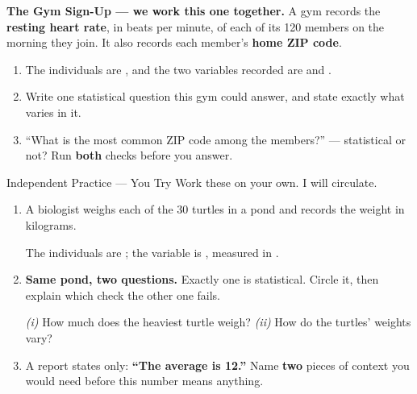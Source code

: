 \documentclass[10pt]{article}
\begin{document}
\boxguard[20]
\begin{practicebox}
\small
\textbf{The Gym Sign-Up --- we work this one together.} A gym records the \textbf{resting heart
rate}, in beats per minute, of each of its 120 members on the morning they join. It also records
each member's \textbf{home ZIP code}.

\begin{enumerate}[label=\textbf{\alph*.}, leftmargin=1.8em, itemsep=7pt]
  \item The individuals are \blank{4.6cm}, and the two variables recorded are
        \blank{3.4cm} and \blank{3.0cm}.
  \item Write one statistical question this gym could answer, and state exactly what varies
        in it.\\[3pt]
  \item ``What is the most common ZIP code among the members?'' --- statistical or not? Run
        \textbf{both} checks before you answer.\\[3pt]
\end{enumerate}
\end{practicebox}

\vspace{0.10in}

\boxguard[20]
\begin{notesbox}{Independent Practice --- You Try}
\small
Work these on your own. I will circulate.

\begin{enumerate}[leftmargin=1.9em, itemsep=8pt]
  \item A biologist weighs each of the 30 turtles in a pond and records the weight in kilograms.

        The individuals are \blank{4.4cm}; the variable is \blank{3.0cm},
        measured in \blank{2.2cm}.
  \item \textbf{Same pond, two questions.} Exactly one is statistical. Circle it, then explain
        which check the other one fails.

        \vspace{4pt}
        \hspace{1.0em}\emph{(i)} How much does the heaviest turtle weigh?
        \hfill
        \emph{(ii)} How do the turtles' weights vary?
        \hspace{1.0em}\\[5pt]
  \item A report states only: \textbf{``The average is 12.''} Name \textbf{two} pieces of
        context you would need before this number means anything.\\[3pt]
\end{enumerate}
\end{notesbox}
\end{document}
